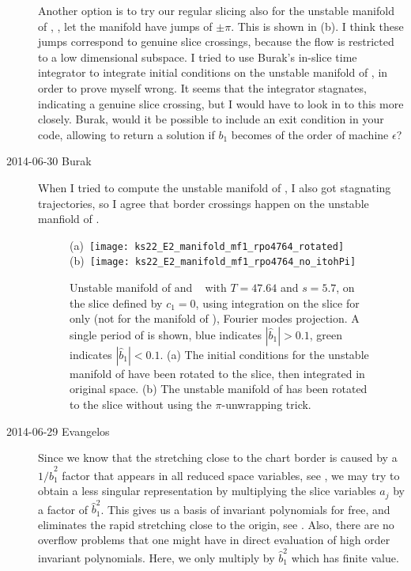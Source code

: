 \begin{description}
Another option is to try our regular slicing also for the unstable manifold of
, \ie, let the manifold have jumps of $\pm\pi$. This is shown in (b).
I think these jumps correspond to genuine slice crossings, because the flow is restricted
to a low dimensional subspace. I tried to use Burak's in-slice time integrator to
integrate initial conditions on the unstable manifold of , in
order to prove myself wrong. It seems that the integrator stagnates, indicating a
genuine slice crossing, but I would have to look in to this more closely.
Burak, would it be possible to include an exit condition in your code,
allowing to return a solution if $b_1$ becomes of the order of machine $\epsilon$?

\item[2014-06-30 Burak] When I tried to compute the unstable manifold of ,
I also got stagnating trajectories, so I agree that border crossings happen on
the unstable manfiold of .

\begin{figure}[ht!]
\begin{center}
(a)~\texttt{[image: ks22\_E2\_manifold\_mf1\_rpo4764\_rotated]}~
(b)~\texttt{[image: ks22\_E2\_manifold\_mf1\_rpo4764\_no\_itohPi]}~
\end{center}
\caption{
Unstable manifold of  and \rpo\  with $T=47.64$ and $s=5.7$,
on the slice defined by $c_1=0$, using integration on the slice for  only
(not for the manifold of ), Fourier modes projection.
A single period of  is shown, blue indicates $|\hat{b}_1|>0.1$, green indicates
 $|\hat{b}_1|<0.1$.
(a) The initial conditions for the unstable manifold of  have been rotated
to the slice, then integrated in original space.
(b) The unstable manifold of  has been rotated to the slice without
 using the $\pi$-unwrapping trick.
       }
\label{f:ks22_E2_manifold_slice1_rpo4764_prob}
\end{figure}

\item[2014-06-29 Evangelos] Since we know that the stretching close to the chart
border is caused by a $1/\hat{b}_1^2$ factor that appears in all reduced space variables,
see , we may try to obtain a less singular representation by
multiplying the slice variables $\hat{a}_j$ by a factor of $\hat{b}_1^2$. This gives us
a basis of invariant polynomials for free, and eliminates the rapid stretching close
to the origin, see . Also, there are no
overflow problems that one might have in direct evaluation of high order invariant
polynomials. Here, we only multiply by $\hat{b}_1^2$ which has finite value.


\end{description}
